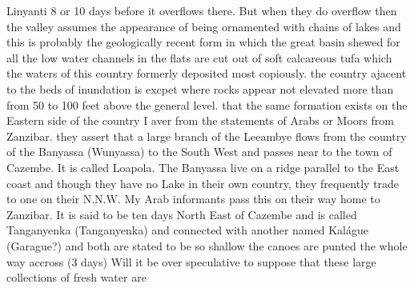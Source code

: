 \documentclass[11pt,twoside]{article}\makeatletter
\begin{document}
Linyanti 8 or 10 days  \newline before it overflows there. But when they do  \newline overflow then the valley assumes the appearance  \newline of being ornamented with chains of lakes  \newline and this is probably the geologically recent  \newline form in which the great basin shewed  \newline for all the low water channels in the flats  \newline are cut out of soft calcareous tufa  \newline which the waters of this country formerly  \newline deposited most copiously. the country  \newline ajacent to the beds of inundation is  \newline excpet where rocks appear not elevated  \newline more than from 50 to 100 feet above the  \newline general level. \newline  \indent that the same formation exists on  \newline the Eastern side of the country I aver  \newline from the statements of Arabs or Moors  \newline from Zanzibar. they assert that a  \newline large branch of the Leeambye flows  \newline from the country of the Banyassa  \newline (Wunyassa) to the South West and passes  \newline near to the town of Cazembe. It is  \newline called Loapola. The Banyassa  \newline live on a ridge parallel to the East coast {\newline \newline \noindent [0008]}  \newline and though they have no Lake in their own  \newline country, they frequently trade to one on their  \newline N.N.W. My Arab informants pass this  \newline on their way home to Zanzibar. It is said  \newline to be ten days North East of Cazembe and is  \newline called Tanganyenka (Tanganyenka)   \newline and connected with another named  \newline Kalágue (Garague?) and both are  \newline stated to be so shallow the canoes are punted  \newline the whole way accross (3 days) Will it be  \newline over speculative to suppose that these  \newline large collections of fresh water are 
\end{document}
